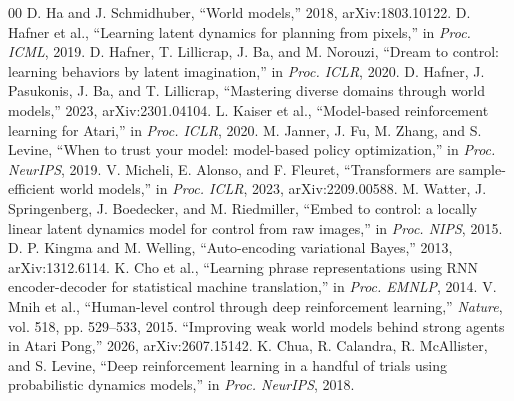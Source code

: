 \begin{thebibliography}{00}
 D. Ha and J. Schmidhuber, ``World models,'' 2018, arXiv:1803.10122.
 D. Hafner et al., ``Learning latent dynamics for planning from pixels,'' in \emph{Proc. ICML}, 2019.
 D. Hafner, T. Lillicrap, J. Ba, and M. Norouzi, ``Dream to control: learning behaviors by latent imagination,'' in \emph{Proc. ICLR}, 2020.
 D. Hafner, J. Pasukonis, J. Ba, and T. Lillicrap, ``Mastering diverse domains through world models,'' 2023, arXiv:2301.04104.
 L. Kaiser et al., ``Model-based reinforcement learning for Atari,'' in \emph{Proc. ICLR}, 2020.
 M. Janner, J. Fu, M. Zhang, and S. Levine, ``When to trust your model: model-based policy optimization,'' in \emph{Proc. NeurIPS}, 2019.
 V. Micheli, E. Alonso, and F. Fleuret, ``Transformers are sample-efficient world models,'' in \emph{Proc. ICLR}, 2023, arXiv:2209.00588.
 M. Watter, J. Springenberg, J. Boedecker, and M. Riedmiller, ``Embed to control: a locally linear latent dynamics model for control from raw images,'' in \emph{Proc. NIPS}, 2015.
 D. P. Kingma and M. Welling, ``Auto-encoding variational Bayes,'' 2013, arXiv:1312.6114.
 K. Cho et al., ``Learning phrase representations using RNN encoder-decoder for statistical machine translation,'' in \emph{Proc. EMNLP}, 2014.
 V. Mnih et al., ``Human-level control through deep reinforcement learning,'' \emph{Nature}, vol. 518, pp. 529--533, 2015.
 ``Improving weak world models behind strong agents in Atari Pong,'' 2026, arXiv:2607.15142. %
 K. Chua, R. Calandra, R. McAllister, and S. Levine, ``Deep reinforcement learning in a handful of trials using probabilistic dynamics models,'' in \emph{Proc. NeurIPS}, 2018.
\end{thebibliography}

